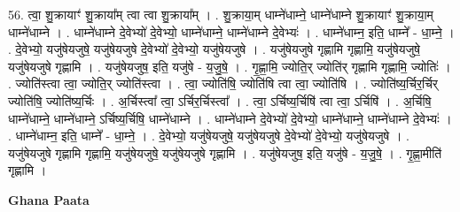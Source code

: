 \documentclass[17pt]{extarticle}
\begin{document}
56. त्वा॒ शु॒क्रायाꣳ॑ शु॒क्राया᳚म् त्वा त्वा शु॒क्राया᳚म् । . शु॒क्राया॒म् धाम्ने॑धाम्ने॒ धाम्ने॑धाम्ने शु॒क्रायाꣳ॑ शु॒क्राया॒म् धाम्ने॑धाम्ने । . धाम्ने॑धाम्ने दे॒वेभ्यो॑ दे॒वेभ्यो॒ धाम्ने॑धाम्ने॒ धाम्ने॑धाम्ने दे॒वेभ्यः॑ । . धाम्ने॑धाम्न॒ इति॒ धाम्ने᳚ - धा॒म्ने॒ । . दे॒वेभ्यो॒ यजु॑षेयजुषे॒ यजु॑षेयजुषे दे॒वेभ्यो॑ दे॒वेभ्यो॒ यजु॑षेयजुषे । . यजु॑षेयजुषे गृह्णामि गृह्णामि॒ यजु॑षेयजुषे॒ यजु॑षेयजुषे गृह्णामि । . यजु॑षेयजुष॒ इति॒ यजु॑षे - य॒जु॒षे॒ । . गृ॒ह्णा॒मि॒ ज्योति॒र् ज्योति॑र् गृह्णामि गृह्णामि॒ ज्योतिः॑ । . ज्योति॑स्त्वा त्वा॒ ज्योति॒र् ज्योति॑स्त्वा । . त्वा॒ ज्योति॑षि॒ ज्योति॑षि त्वा त्वा॒ ज्योति॑षि । . ज्योति॑ष्य॒र्चिर॒र्चिर् ज्योति॑षि॒ ज्योति॑ष्य॒र्चिः । . अ॒र्चिस्त्वा᳚ त्वा॒ ऽर्चिर॒र्चिस्त्वा᳚ । . त्वा॒ ऽर्चिष्य॒र्चिषि॑ त्वा त्वा॒ ऽर्चिषि॑ । . अ॒र्चिषि॒ धाम्ने॑धाम्ने॒ धाम्ने॑धाम्ने॒ ऽर्चिष्य॒र्चिषि॒ धाम्ने॑धाम्ने । . धाम्ने॑धाम्ने दे॒वेभ्यो॑ दे॒वेभ्यो॒ धाम्ने॑धाम्ने॒ धाम्ने॑धाम्ने दे॒वेभ्यः॑ । . धाम्ने॑धाम्न॒ इति॒ धाम्ने᳚ - धा॒म्ने॒ । . दे॒वेभ्यो॒ यजु॑षेयजुषे॒ यजु॑षेयजुषे दे॒वेभ्यो॑ दे॒वेभ्यो॒ यजु॑षेयजुषे । . यजु॑षेयजुषे गृह्णामि गृह्णामि॒ यजु॑षेयजुषे॒ यजु॑षेयजुषे गृह्णामि । . यजु॑षेयजुष॒ इति॒ यजु॑षे - य॒जु॒षे॒ । . गृ॒ह्णा॒मीति॑ गृह्णामि । \newline

\textbf{Ghana Paata } \newline
\end{document}
